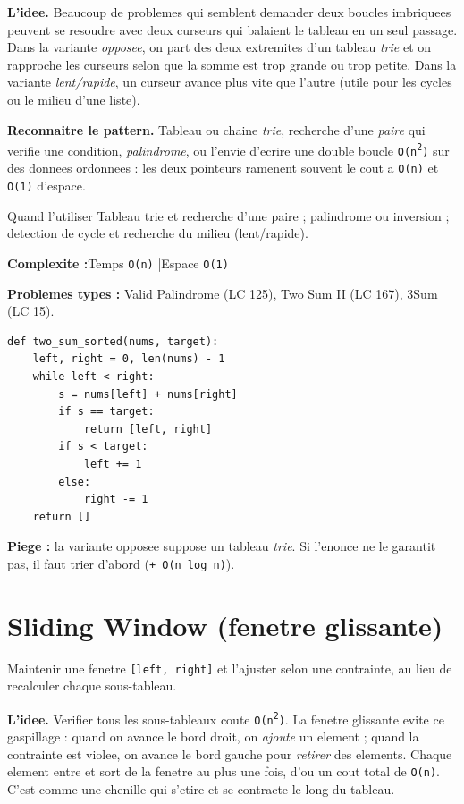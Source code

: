 \documentclass[11pt,a4paper]{article}
\newcommand{\complexite}[2]{%
  \noindent\textbf{Complexite :}\quad Temps \texttt{#1} \quad|\quad Espace \texttt{#2}\par\smallskip}
\newcommand{\leetcode}[1]{\noindent\textbf{Problemes types :} #1\par\medskip}
\begin{document}
\textbf{L'idee.} Beaucoup de problemes qui semblent demander deux boucles
imbriquees peuvent se resoudre avec deux curseurs qui balaient le tableau en un
seul passage. Dans la variante \emph{opposee}, on part des deux extremites d'un
tableau \emph{trie} et on rapproche les curseurs selon que la somme est trop
grande ou trop petite. Dans la variante \emph{lent/rapide}, un curseur avance
plus vite que l'autre (utile pour les cycles ou le milieu d'une liste).

\textbf{Reconnaitre le pattern.} Tableau ou chaine \emph{trie}, recherche d'une
\emph{paire} qui verifie une condition, \emph{palindrome}, ou l'envie d'ecrire
une double boucle \texttt{O(n\textsuperscript{2})} sur des donnees ordonnees :
les deux pointeurs ramenent souvent le cout a \texttt{O(n)} et \texttt{O(1)}
d'espace.

\begin{infobox}{Quand l'utiliser}
Tableau trie et recherche d'une paire ; palindrome ou inversion ; detection de
cycle et recherche du milieu (lent/rapide).
\end{infobox}

\complexite{O(n)}{O(1)}
\leetcode{Valid Palindrome (LC 125), Two Sum II (LC 167), 3Sum (LC 15).}

\begin{lstlisting}
def two_sum_sorted(nums, target):
    left, right = 0, len(nums) - 1
    while left < right:
        s = nums[left] + nums[right]
        if s == target:
            return [left, right]
        if s < target:
            left += 1
        else:
            right -= 1
    return []
\end{lstlisting}

\textbf{Piege :} la variante opposee suppose un tableau \emph{trie}. Si l'enonce
ne le garantit pas, il faut trier d'abord (\texttt{+ O(n log n)}).

\section{Sliding Window (fenetre glissante)}
Maintenir une fenetre \texttt{[left, right]} et l'ajuster selon une contrainte,
au lieu de recalculer chaque sous-tableau.

\textbf{L'idee.} Verifier tous les sous-tableaux coute \texttt{O(n\textsuperscript{2})}.
La fenetre glissante evite ce gaspillage : quand on avance le bord droit, on
\emph{ajoute} un element ; quand la contrainte est violee, on avance le bord
gauche pour \emph{retirer} des elements. Chaque element entre et sort de la
fenetre au plus une fois, d'ou un cout total de \texttt{O(n)}. C'est comme une
chenille qui s'etire et se contracte le long du tableau.
\end{document}
